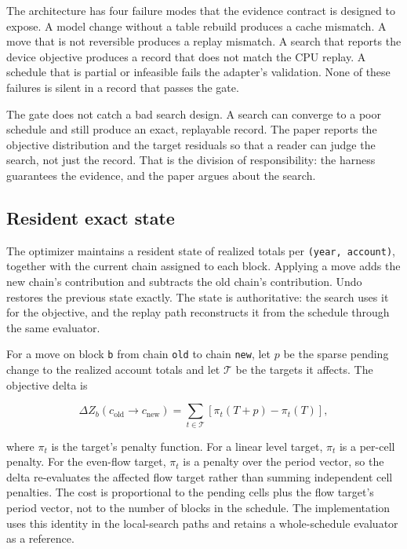 \documentclass[11pt]{article}
\begin{document}
The architecture has four failure modes that the evidence contract is designed to expose. A model
change without a table rebuild produces a cache mismatch. A move that is not reversible produces a
replay mismatch. A search that reports the device objective produces a record that does not match the
CPU replay. A schedule that is partial or infeasible fails the adapter's validation. None of these
failures is silent in a record that passes the gate.

The gate does not catch a bad search design. A search can converge to a poor schedule and still
produce an exact, replayable record. The paper reports the objective distribution and the target
residuals so that a reader can judge the search, not just the record. That is the division of
responsibility: the harness guarantees the evidence, and the paper argues about the search.

\subsection{Resident exact state}\label{resident-exact-state}

The optimizer maintains a resident state of realized totals per \texttt{(year,\ account)}, together with the current chain assigned to each block. Applying a move adds the new chain's contribution and subtracts the old chain's contribution. Undo restores the previous state exactly. The state is authoritative: the search uses it for the objective, and the replay path reconstructs it from the schedule through the same evaluator.

For a move on block \texttt{b} from chain \texttt{old} to chain \texttt{new}, let $p$ be the sparse
pending change to the realized account totals and let $\mathcal{T}$ be the targets it affects. The
objective delta is

\begin{equation}
\Delta Z_b(c_{\mathrm{old}}\!\to c_{\mathrm{new}})
= \sum_{t\in\mathcal{T}}\left[\pi_t(T+p)-\pi_t(T)\right],
\end{equation}

where $\pi_t$ is the target's penalty function. For a linear level target, $\pi_t$ is a per-cell
penalty. For the even-flow target, $\pi_t$ is a penalty over the period vector, so the delta
re-evaluates the affected flow target rather than summing independent cell penalties. The cost is
proportional to the pending cells plus the flow target's period vector, not to the number of blocks
in the schedule. The implementation uses this identity in the local-search paths and retains a
whole-schedule evaluator as a reference.
\end{document}

